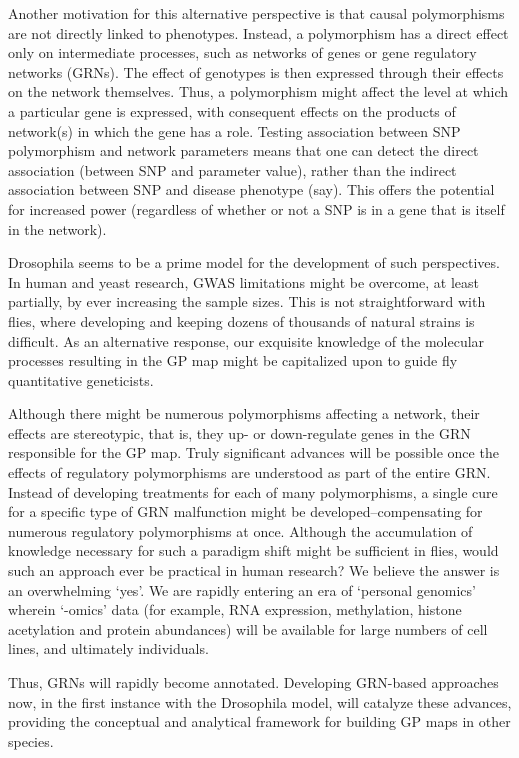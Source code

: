 Another motivation for this alternative perspective is that causal polymorphisms are not directly linked to phenotypes. Instead, a polymorphism has a direct effect only on intermediate processes, such as networks of genes or gene regulatory networks (GRNs). The effect of genotypes is then expressed through their effects on the network themselves. Thus, a polymorphism might affect the level at which a particular gene is expressed, with consequent effects on the products of network(s) in which the gene has a role. Testing association between SNP polymorphism and network parameters means that one can detect the direct association (between SNP and parameter value), rather than the indirect association between SNP and disease phenotype (say). This offers the potential for increased power (regardless of whether or not a SNP is in a gene that is itself in the network).

Drosophila seems to be a prime model for the development of such perspectives. In human and yeast research, GWAS limitations might be overcome, at least partially, by ever increasing the sample sizes. This is not straightforward with flies, where developing and keeping dozens of thousands of natural strains is difficult. As an alternative response, our exquisite knowledge of the molecular processes resulting in the GP map might be capitalized upon to guide fly quantitative geneticists.

Although there might be numerous polymorphisms affecting a network, their effects are stereotypic, that is, they up- or down-regulate genes in the GRN responsible for the GP map. Truly significant advances will be possible once the effects of regulatory polymorphisms are understood as part of the entire GRN. Instead of developing treatments for each of many polymorphisms, a single cure for a specific type of GRN malfunction might be developed–compensating for numerous regulatory polymorphisms at once. Although the accumulation of knowledge necessary for such a paradigm shift might be sufficient in flies, would such an approach ever be practical in human research? We believe the answer is an overwhelming `yes'. We are rapidly entering an era of `personal genomics' wherein `-omics' data (for example, RNA expression, methylation, histone acetylation and protein abundances) will be available for large numbers of cell lines, and ultimately individuals.

Thus, GRNs will rapidly become annotated. Developing GRN-based approaches now, in the first instance with the Drosophila model, will catalyze these advances, providing the conceptual and analytical framework for building GP maps in other species.

